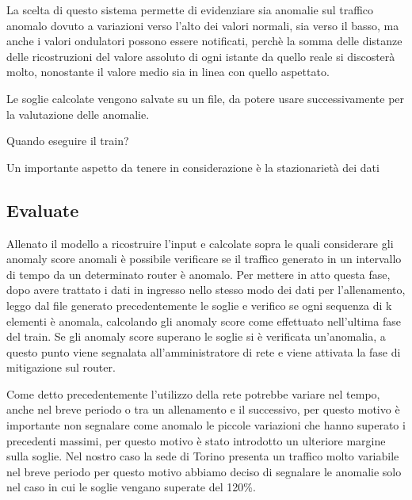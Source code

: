 La scelta di questo sistema permette di evidenziare sia anomalie sul traffico anomalo dovuto a variazioni verso l'alto dei valori normali, sia verso il basso, ma anche i valori ondulatori possono essere notificati, perchè la somma delle distanze delle ricostruzioni del valore assoluto di ogni istante da quello reale si discosterà molto, nonostante il valore medio sia in linea con quello aspettato.

Le soglie calcolate vengono salvate su un file, da potere usare successivamente per la valutazione delle anomalie.

Quando eseguire il train?

Un importante aspetto da tenere in considerazione è la stazionarietà dei dati





\subsection{Evaluate}
Allenato il modello a ricostruire l'input e calcolate sopra le quali considerare gli anomaly score anomali è possibile verificare se il traffico generato in un intervallo di tempo da un determinato router è anomalo.  
Per mettere in atto questa fase, dopo avere trattato i dati in ingresso nello stesso modo dei dati per l'allenamento, leggo dal file generato precedentemente le soglie e verifico se ogni sequenza di k elementi è anomala, calcolando gli anomaly score come effettuato nell'ultima fase del train. Se gli anomaly score superano le soglie si è verificata un'anomalia, a questo punto viene segnalata all'amministratore di rete e viene attivata la fase di mitigazione sul router.

Come detto precedentemente l'utilizzo della rete potrebbe variare nel tempo, anche nel breve periodo o tra un allenamento e il successivo, per questo motivo è importante non segnalare come anomalo le piccole variazioni che hanno superato i precedenti massimi, per questo motivo è stato introdotto un ulteriore margine sulla soglie. Nel nostro caso la sede di Torino presenta un traffico molto variabile nel breve periodo per questo motivo abbiamo deciso di segnalare le anomalie solo nel caso in cui le soglie vengano superate del 120\%.

